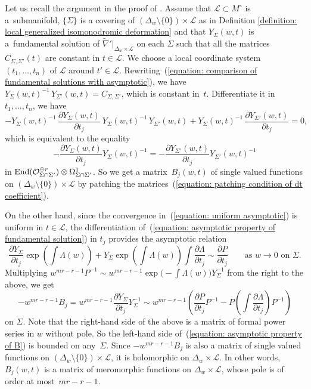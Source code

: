 \documentclass[pdftex]{sigma}
\numberwithin{equation}{section}
\newcommand\End{\mathop{\rm End}\nolimits}
\begin{document}
Let us recall the argument in the proof of \cite[Theorem 3.1]{Jimbo-Miwa-Ueno}.
Assume that
${\mathcal L}\subset M^{\circ}$
is a~submanifold,
$\{ \Sigma\}$ is a covering of $(\Delta_w\setminus\{0\})\times{\mathcal L}$
as in Definition \ref{definition: local generalized isomonodromic deformation}
and that $Y_{\Sigma}(w,t)$ is a~fundamental solution of
$\tilde{\nabla}'|_{\Delta_w\times{\mathcal L}}$ on each $\Sigma$
such that all the matrices $C_{\Sigma,\Sigma'}(t)$ are constant in $t\in {\mathcal L}$.
We choose a local coordinate system
$(t_1,\dots,t_n)$ of ${\mathcal L}$
around $t'\in{\mathcal L}$.
Rewriting~(\ref{equation: comparison of fundamental solutions with asymptotic}),
we have
$ Y_{\Sigma}(w,t)^{-1} \, Y_{\Sigma'}(w,t)
=C_{\Sigma,\Sigma'}$,
which is constant in~$t$.
Differentiate it in
$t_1,\dots,t_n$, we have
\[
 -Y_{\Sigma}(w,t)^{-1}\, \frac{\partial Y_{\Sigma}(w,t)}{\partial t_j} \: Y_{\Sigma}(w,t)^{-1}\,Y_{\Sigma'}(w,t)
 +Y_{\Sigma}(w,t)^{-1} \, \frac{\partial Y_{\Sigma'}(w,t)}{\partial t_j} =0,
\]
which is equivalent to the equality
\begin{equation} \label{equation: patching condition of dt coefficient}
 -\frac{\partial Y_{\Sigma}(w,t)}{\partial t_j} Y_{\Sigma}(w,t)^{-1}
 =
 -\frac{\partial Y_{\Sigma'}(w,t)}{\partial t_j} Y_{\Sigma'}(w,t)^{-1}
\end{equation}
in
$\End({\mathcal O}_{\Sigma\cap\Sigma'}^{\oplus r})
\otimes\Omega^1_{{\Sigma}\cap{\Sigma'}}$.
So we get a matrix~$B_j(w,t)$ of single valued functions on $(\Delta_w\setminus\{0\})\times{\mathcal L}$
by patching the matrices~(\ref{equation: patching condition of dt coefficient}).

On the other hand, since the convergence in~(\ref{equation: uniform asymptotic})
is uniform in $t\in{\mathcal L}$,
the differentiation of~(\ref{equation: asymptotic property of fundamental solution})
in $t_j$ provides the asymptotic relation
\[
 \frac{\partial Y_{\Sigma}}{\partial t_j} \exp\left( \int\Lambda(w) \right)
 +Y_{\Sigma} \exp\left( \int\Lambda(w) \right) \int\frac{\partial \Lambda}{\partial t_j}
 \sim
 \frac{\partial P}{\partial t_j}
 \qquad \text{as $w\to 0$ on $\Sigma$}.
\]
Multiplying $w^{mr-r-1}P^{-1}\sim w^{mr-r-1}\exp\big({-}\int\Lambda(w)\big) Y_{\Sigma}^{-1}$
from the right to the above, we get
\begin{equation} \label{equation: asymptotic property of B}
 -w^{mr-r-1}B_j
 =
 w^{mr-r-1}\frac{\partial Y_{\Sigma}}{\partial t_j} Y_{\Sigma}^{-1}
 \sim
 w^{mr-r-1}
 \left( \frac{\partial P}{\partial t_j} P^{-1}
 - P \left( \int\frac{\partial \Lambda}{\partial t_j} \right) P^{-1}
\right)
\end{equation}
on $\Sigma$.
Note that the right-hand side of the above is a matrix of formal power series in $w$
without pole.
So the left-hand side of~(\ref{equation: asymptotic property of B})
is bounded on any~$\Sigma$.
Since $-w^{mr-r-1}B_j$ is also a matrix of single valued functions on
$(\Delta_w\setminus\{0\})\times{\mathcal L}$,
it is holomorphic on $\Delta_w\times{\mathcal L}$.
In other words,
$B_j(w,t)$ is a matrix of meromorphic functions on $\Delta_w\times{\mathcal L}$,
whose pole is of order at most~$mr-r-1$.
\end{document}
